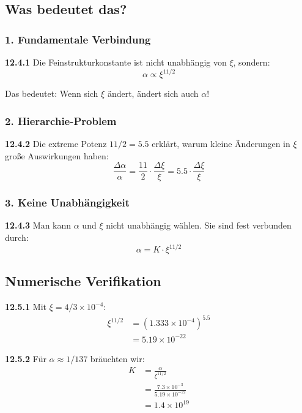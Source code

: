 \documentclass[12pt,a4paper]{article}
\begin{document}
\subsection{Was bedeutet das?}

\subsubsection{1. Fundamentale Verbindung}
\noindent \textbf{12.4.1} Die Feinstrukturkonstante ist nicht unabhängig von $\xi$, sondern:
\begin{equation}
	\alpha \propto \xi^{11/2}
\end{equation}

Das bedeutet: Wenn sich $\xi$ ändert, ändert sich auch $\alpha$!

\subsubsection{2. Hierarchie-Problem}
\noindent \textbf{12.4.2} Die extreme Potenz $11/2 = 5.5$ erklärt, warum kleine Änderungen in $\xi$ große Auswirkungen haben:
\begin{equation}
	\frac{\Delta \alpha}{\alpha} = \frac{11}{2} \cdot \frac{\Delta \xi}{\xi} = 5.5 \cdot \frac{\Delta \xi}{\xi}
\end{equation}

\subsubsection{3. Keine Unabhängigkeit}
\noindent \textbf{12.4.3} Man kann $\alpha$ und $\xi$ nicht unabhängig wählen. Sie sind fest verbunden durch:
\begin{equation}
	\alpha = K \cdot \xi^{11/2}
\end{equation}

\subsection{Numerische Verifikation}

\noindent \textbf{12.5.1} Mit $\xi = 4/3 \times 10^{-4}$:
\begin{align}
	\xi^{11/2} &= (1.333 \times 10^{-4})^{5.5} \\
	&= 5.19 \times 10^{-22}
\end{align}

\noindent \textbf{12.5.2} Für $\alpha \approx 1/137$ bräuchten wir:
\begin{align}
	K &= \frac{\alpha}{\xi^{11/2}} \\
	&= \frac{7.3 \times 10^{-3}}{5.19 \times 10^{-22}} \\
	&= 1.4 \times 10^{19}
\end{align}
\end{document}
